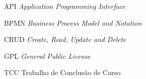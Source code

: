 \begin{siglas}
  \item[API] \textit{Application Programming Interface}
  \item[BPMN] \textit{Business Process Model and Notation}
  \item[CRUD] \textit{Create, Read, Update and Delete} 
  \item[GPL] \textit{General Public License} 
  \item[TCC] Trabalho de Conclusão de Curso
\end{siglas}
